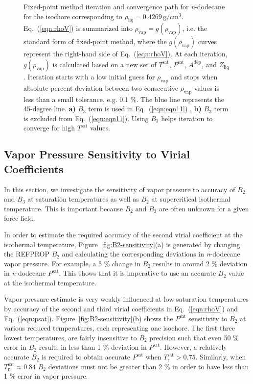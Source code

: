 \documentclass[5p,times]{elsarticle}
\begin{document}
\begin{figure}
\caption{
Fixed-point method iteration and convergence path for \textit{n}-dodecane for the isochore corresponding to $\rho_{\mathrm{liq}}=0.4269\,\mathrm{g/cm^3}$. Eq.~(\ref{eqn:rhoV}) is summarized into $\rho_{\mathrm{vap}}=g(\rho_{\mathrm{vap}})$, i.e. the standard form of fixed-point method, where the $g(\rho_{\mathrm{vap}})$ curves represent the right-hand side of Eq.~(\ref{eqn:rhoV}). At each iteration, $g(\rho_{\mathrm{vap}})$ is calculated based on a new set of $T^{\mathrm{sat}}$, $P^{\mathrm{sat}}$, $A^\mathrm{dep}$, and $Z_{\mathrm{liq}}$. Iteration starts with a low initial guess for $\rho_{\mathrm{vap}}$ and stops when absolute percent deviation between two consecutive $\rho_{\mathrm{vap}}$ values is less than a small tolerance, e.g. 0.1 \%.
The blue line represents the 45-degree line. \textbf{a)} $B_3$ term is used in Eq.~(\ref{eqn:eqn11})
, \textbf{b)} $B_3$ term is excluded from Eq.~(\ref{eqn:eqn11}). Using $B_3$ helps iteration to converge for high $T^{\mathrm{sat}}$ values.}
\label{fig:convergence-path}
\end{figure}

\subsection{Vapor Pressure Sensitivity to Virial Coefficients} \label{sec:Bx-Sensitivity}
In this section, we investigate the sensitivity of vapor pressure to accuracy of $B_2$ and $B_3$ at saturation temperatures as well as $B_2$ at supercritical isothermal temperature. This is important because $B_2$ and $B_3$ are often unknown for a given force field. 

In order to estimate the required accuracy of the second virial coefficient at the isothermal temperature, Figure~\ref{fig:B2-sensitivity}(a) is generated by changing the REFPROP $B_2$ and calculating the corresponding deviations in \textit{n}-dodecane vapor pressure. For example, a 5 \% change in $B_2$ results in around 2 \% deviation in \textit{n}-dodecane $P^{\mathrm{sat}}$. This shows that it is imperative to use an accurate $B_2$ value at the isothermal temperature.

Vapor pressure estimate is very weakly influenced at low saturation temperatures by accuracy of the second and third virial coefficients in Eq.~(\ref{eqn:rhoV}) and Eq.~(\ref{eqn:psat}). Figure~\ref{fig:B2-sensitivity}(b) shows the $P^{\mathrm{sat}}$ sensitivity to $B_2$ at various reduced temperatures, each representing one isochore. The first three lowest temperatures, are fairly insensitive to $B_2$ precision such that even 50 \% error in $B_2$ results in less than 1 \% deviation in $P^{\mathrm{sat}}$. However, a relatively accurate $B_2$ is required to obtain accurate $P^{\mathrm{sat}}$ when $T_\mathrm{r}^\mathrm{sat}>0.75$. Similarly, when $T_\mathrm{r}^\mathrm{sat} \approx 0.84$ $B_2$ deviations must not be greater than 2 \% in order to have less than 1 \% error in vapor pressure.
\end{document}
